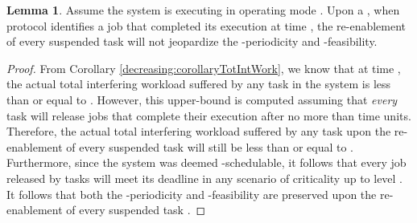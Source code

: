 \documentclass[10pt, conference, compsocconf, final]{IEEEtran}
\theoremstyle{definition}
\newtheorem{lemma}{Lemma}
\begin{document}
{\begin{lemma}\label{lemma:decreasing:safeOldModeTasks}
Assume the system is executing in operating mode . Upon a , when protocol identifies a job  that completed its execution at time , the re-enablement of every suspended task  will not jeopardize the -periodicity and -feasibility.
\end{lemma}
\begin{proof}
From Corollary \ref{decreasing:corollaryTotIntWork}, we know that at time , the actual total interfering workload suffered by any task  in the system is less than or equal to . However, this upper-bound is computed assuming that \emph{every} task  will release jobs that complete their execution after no more than  time units. Therefore, the actual total interfering workload suffered by any task  upon the re-enablement of every suspended task  will still be less than or equal to . Furthermore, since the system was deemed -schedulable, it follows that every job released by tasks  will meet its deadline in any scenario of criticality up to level . It follows that both the -periodicity and -feasibility are preserved upon the re-enablement of every suspended task .
\end{proof}

}
\end{document}
